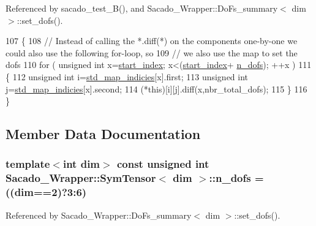 Referenced by sacado\+\_\+test\+\_\+B(), and Sacado\+\_\+\+Wrapper\+::\+Do\+Fs\+\_\+summary$<$ dim $>$\+::set\+\_\+dofs().


\begin{DoxyCode}
107     \{
108         \textcolor{comment}{// Instead of calling the *.diff(*) on the components one-by-one we could also use the following
       for-loop, so}
109         \textcolor{comment}{// we also use the map to set the dofs}
110         \textcolor{keywordflow}{for} ( \textcolor{keywordtype}{unsigned} \textcolor{keywordtype}{int} x=\hyperlink{classSacado__Wrapper_1_1SymTensor_afe921e6044e4110fcfc848c52844d650}{start\_index}; x<(\hyperlink{classSacado__Wrapper_1_1SymTensor_afe921e6044e4110fcfc848c52844d650}{start\_index}+
      \hyperlink{classSacado__Wrapper_1_1SymTensor_a733bc4b029ff8d067b48e7ce3ee7606b}{n\_dofs}); ++x )
111         \{
112             \textcolor{keywordtype}{unsigned} \textcolor{keywordtype}{int} i=\hyperlink{classSacado__Wrapper_1_1SymTensor_ae3b1c56cde3fc5c7805b618ef3d9de75}{std\_map\_indicies}[x].first;
113             \textcolor{keywordtype}{unsigned} \textcolor{keywordtype}{int} j=\hyperlink{classSacado__Wrapper_1_1SymTensor_ae3b1c56cde3fc5c7805b618ef3d9de75}{std\_map\_indicies}[x].second;
114             (*this)[i][j].diff(x,nbr\_total\_dofs);
115         \}
116     \}
\end{DoxyCode}


\subsection{Member Data Documentation}
\subsubsection[{\texorpdfstring{n\+\_\+dofs}{n_dofs}}]{\setlength{\rightskip}{0pt plus 5cm}template$<$int dim$>$ const unsigned {\bf int} {\bf Sacado\+\_\+\+Wrapper\+::\+Sym\+Tensor}$<$ dim $>$\+::n\+\_\+dofs = ((dim==2)?3\+:6)\hspace{0.3cm}{\ttfamily [static]}}\hypertarget{classSacado__Wrapper_1_1SymTensor_a733bc4b029ff8d067b48e7ce3ee7606b}{}\label{classSacado__Wrapper_1_1SymTensor_a733bc4b029ff8d067b48e7ce3ee7606b}


Referenced by Sacado\+\_\+\+Wrapper\+::\+Do\+Fs\+\_\+summary$<$ dim $>$\+::set\+\_\+dofs().

